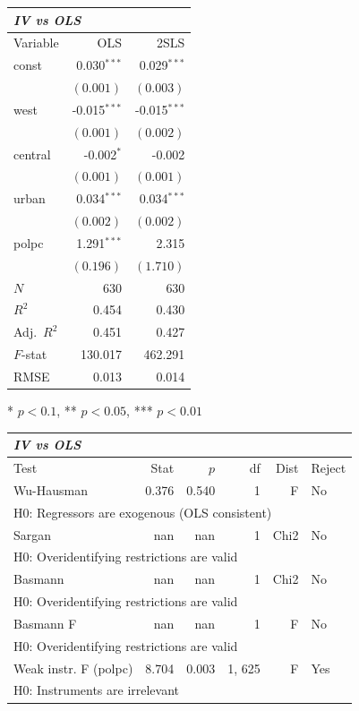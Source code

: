 \documentclass{article}
\begin{document}
\renewcommand{\arraystretch}{1.1}
\setlength{\tabcolsep}{6pt}
\begin{tabular}{lrr}
\hline
\multicolumn{3}{l}{\textit{IV vs OLS}} \\
\hline
Variable & OLS & 2SLS \\
\hline
const & 0.030$^{\ast\ast\ast}$ & 0.029$^{\ast\ast\ast}$ \\
 & $(0.001)$ & $(0.003)$ \\
west & -0.015$^{\ast\ast\ast}$ & -0.015$^{\ast\ast\ast}$ \\
 & $(0.001)$ & $(0.002)$ \\
central & -0.002$^{\ast}$ & -0.002 \\
 & $(0.001)$ & $(0.001)$ \\
urban & 0.034$^{\ast\ast\ast}$ & 0.034$^{\ast\ast\ast}$ \\
 & $(0.002)$ & $(0.002)$ \\
polpc & 1.291$^{\ast\ast\ast}$ & 2.315 \\
 & $(0.196)$ & $(1.710)$ \\
\hline
$N$ & 630 & 630 \\
$R^2$ & 0.454 & 0.430 \\
Adj.\ $R^2$ & 0.451 & 0.427 \\
$F$-stat & 130.017 & 462.291 \\
RMSE & 0.013 & 0.014 \\
\hline
\end{tabular}
\vspace{2pt}
\begin{flushleft}\footnotesize{* $p<0.1$, ** $p<0.05$, *** $p<0.01$}\end{flushleft}

\renewcommand{\arraystretch}{1.1}
\setlength{\tabcolsep}{6pt}
\begin{tabular}{lrrrrl}
\hline
\multicolumn{6}{l}{\textit{IV vs OLS}} \\
\hline
Test & Stat & $p$ & df & Dist & Reject \\
\hline
Wu-Hausman & 0.376 & 0.540 & 1 & F & No \\
\multicolumn{6}{l}{\footnotesize{H0: Regressors are exogenous (OLS consistent)}} \\
Sargan & nan & nan & 1 & Chi2 & No \\
\multicolumn{6}{l}{\footnotesize{H0: Overidentifying restrictions are valid}} \\
Basmann & nan & nan & 1 & Chi2 & No \\
\multicolumn{6}{l}{\footnotesize{H0: Overidentifying restrictions are valid}} \\
Basmann F & nan & nan & 1 & F & No \\
\multicolumn{6}{l}{\footnotesize{H0: Overidentifying restrictions are valid}} \\
Weak instr. F (polpc) & 8.704 & 0.003 & 1, 625 & F & Yes \\
\multicolumn{6}{l}{\footnotesize{H0: Instruments are irrelevant}} \\
\hline
\end{tabular}
\end{document}
